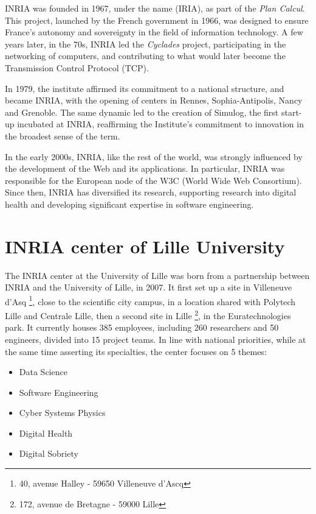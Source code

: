 INRIA was founded in 1967, under the name  (IRIA), as part of the \textit{Plan Calcul}\cite{PlanCalcul}. This project, launched by the French government in 1966, was designed to ensure France's autonomy and sovereignty in the field of information technology.
A few years later, in the 70s, INRIA led the \textit{Cyclades} project, participating in the networking of computers, and contributing to what would later become the Transmission Control Protocol (TCP).

In 1979, the institute affirmed its commitment to a national structure, and became INRIA, with the opening of centers in Rennes, Sophia-Antipolis, Nancy and Grenoble. The same dynamic led to the creation of Simulog, the first start-up incubated at INRIA, reaffirming the Institute's commitment to innovation in the broadest sense of the term.

In the early 2000s, INRIA, like the rest of the world, was strongly influenced by the development of the Web and its applications. In particular, INRIA was responsible for the European node of the W3C (World Wide Web Consortium). Since then, INRIA has diversified its research, supporting research into digital health and developing significant expertise in software engineering. 

\section{INRIA center of Lille University}
The INRIA center at the University of Lille was born from a partnership between INRIA and the University of Lille, in 2007. It first set up a site in Villeneuve d'Asq \footnote{40, avenue Halley - 59650 Villeneuve d'Ascq}, close to the scientific city campus, in a location shared with Polytech Lille and Centrale Lille, then a second site in Lille \footnote{172, avenue de Bretagne - 59000 Lille}, in the Euratechnologies park. It currently houses 385 employees, including 260 researchers and 50 engineers, divided into 15 project teams.
In line with national priorities, while at the same time asserting its specialties, the center focuses on 5 themes: 
\begin{multicols}{2}
    
\begin{itemize}
    \item Data Science
    \item Software Engineering
    \item Cyber Systems Physics
    \item Digital Health
    \item Digital Sobriety
\end{itemize}
\end{multicols}

